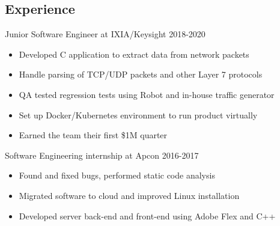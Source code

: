 \documentclass[line,margin]{res}
\begin{document}
	\address{(512)574-6609 ||
	\href{mailto:blakerandall0@gmail.com}{blakerandall0@gmail.com}}

\begin{resume}

\vspace{8pt}

\vspace{-4pt}


\vspace{-4pt}
\section{Experience}
\vspace{12pt}


Junior Software Engineer at IXIA/Keysight
\hfill 2018-2020
	\begin{itemize} \itemsep -2pt
	\item Developed C application to extract data from network packets
	\item Handle parsing of TCP/UDP packets and other Layer 7 protocols
	\item QA tested regression tests using Robot and in-house traffic generator
	\item Set up Docker/Kubernetes environment to run product virtually
	\item Earned the team their first \$1M quarter
	\end{itemize}
\vspace{-8pt}
Software Engineering internship at Apcon
\hfill 2016-2017
\begin{itemize} \itemsep -2pt
	\item Found and fixed bugs, performed static code analysis
	\item Migrated software to cloud and improved Linux installation
	\item Developed server back-end and front-end using Adobe Flex and C++


\end{itemize}
\end{resume}
\end{document}
